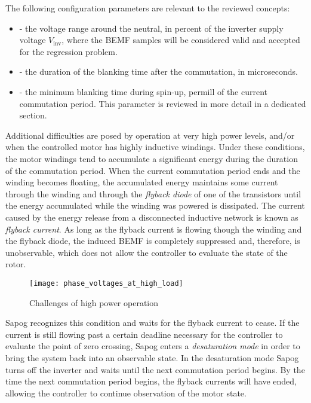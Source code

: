 \documentclass{zubaxdoc}
\begin{document}
The following configuration parameters are relevant to the reviewed concepts:

\begin{itemize}
	\item {} - the voltage range around the neutral,
	in percent of the inverter supply voltage $V_\text{inv}$, where the BEMF samples
	will be considered valid and accepted for the regression problem.
	\item {} - the duration of the blanking time after the commutation, in microseconds.
	\item {} - the minimum blanking time during spin-up,
	permill of the current commutation period.
	This parameter is reviewed in more detail in a dedicated section.
\end{itemize}

Additional difficulties are posed by operation at very high power levels,
and/or when the controlled motor has highly inductive windings.
Under these conditions, the motor windings tend to accumulate a significant energy during the duration
of the commutation period.
When the current commutation period ends and the winding becomes floating,
the accumulated energy maintains some current through the winding and through the \emph{flyback diode}
of one of the transistors until the energy accumulated while the winding was powered is dissipated.
The current caused by the energy release from a disconnected inductive network is known as
\emph{flyback current}.
As long as the flyback current is flowing though the winding and the flyback diode,
the induced BEMF is completely suppressed and, therefore,
is unobservable, which does not allow the controller to evaluate the state of the rotor.

\begin{figure}[hbtp]
	\centering
	\texttt{[image: phase\_voltages\_at\_high\_load]}
	\caption{Challenges of high power operation
		\label{phase_voltages_at_high_load}}
\end{figure}

Sapog recognizes this condition and waits for the flyback current to cease.
If the current is still flowing past a certain deadline necessary for the controller to evaluate the
point of zero crossing, Sapog enters a \emph{desaturation mode} in order to bring the system
back into an observable state.
In the desaturation mode Sapog turns off the inverter and waits until the next commutation period begins.
By the time the next commutation period begins, the flyback currents will have ended,
allowing the controller to continue observation of the motor state.
\end{document}
